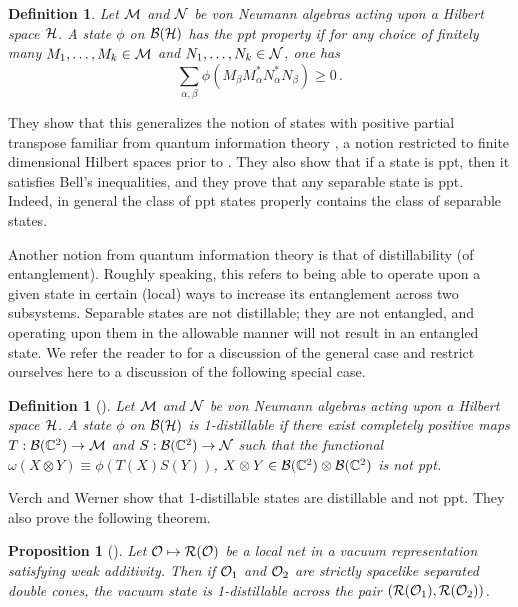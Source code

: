 \documentclass[12pt]{article}
\newtheorem{prop}[theorem]{Proposition}
\newtheorem{definition}[theorem]{Definition}
\def\nind{\noindent}
\def\Bs{{\cal B}}
\def\Hs{{\cal H}}
\def\Ms{{\cal M}}
\def\Ns{{\cal N}}
\def\Os{{\cal O}}
\def\Rs{{\cal R}}
\def\nind{\noindent}
\def\CC{{\mathbb C}}
\begin{document}
\begin{definition} 
Let $\Ms$ and $\Ns$ be von Neumann algebras acting upon a Hilbert 
space $\Hs$. A state $\phi$ on $\Bs(\Hs)$ has the \textnormal{ppt property} 
if for any choice of finitely many $M_1,\ldots,M_k \in \Ms$ and 
$N_1,\ldots,N_k \in \Ns$, one has 
%
$$\sum_{\alpha,\beta} \phi(M_\beta M_\alpha^* N_\alpha^* N_\beta) \geq 0
\, .$$ 
\end{definition}

\nind They show that this generalizes the notion of states with
positive partial transpose familiar from quantum information theory
\cite{Pe}, a notion restricted to finite dimensional Hilbert spaces
prior to \cite{VeWe}.  They also show that if a state is ppt, then it
satisfies Bell's inequalities, and they prove that any separable state is
ppt. Indeed, in general the class of ppt states properly contains the
class of separable states.

     Another notion from quantum information theory is that of
distillability (of entanglement). Roughly speaking, this refers to
being able to operate upon a given state in certain (local) ways to
increase its entanglement across two subsystems.  Separable states are
not distillable; they are not entangled, and operating upon them in
the allowable manner will not result in an entangled state.  We refer
the reader to \cite{VeWe} for a discussion of the general case and
restrict ourselves here to a discussion of the following special case.

\begin{definition} [\cite{VeWe}]
Let $\Ms$ and $\Ns$ be von Neumann algebras acting upon a Hilbert 
space $\Hs$. A state $\phi$ on $\Bs(\Hs)$ is \textnormal{1-distillable} 
if there exist completely positive maps $T : \Bs(\CC^2) \rightarrow \Ms$
and $S : \Bs(\CC^2) \rightarrow \Ns$ such that the functional
$\omega(X \otimes Y) \equiv \phi(T(X)S(Y))$, 
$X \otimes Y \in \Bs(\CC^2) \otimes \Bs(\CC^2)$ is not ppt.
\end{definition}

     Verch and Werner show that 1-distillable states are distillable
and not ppt. They also prove the following theorem.

\begin{prop} [\cite{VeWe}]
Let $\Os \mapsto \Rs(\Os)$ be a local net in a vacuum 
representation satisfying weak additivity. Then if $\Os_1$ and
$\Os_2$ are strictly spacelike separated double cones, the vacuum
state is 1-distillable across the pair $(\Rs(\Os_1),\Rs(\Os_2))$.
\end{prop}
\end{document}
